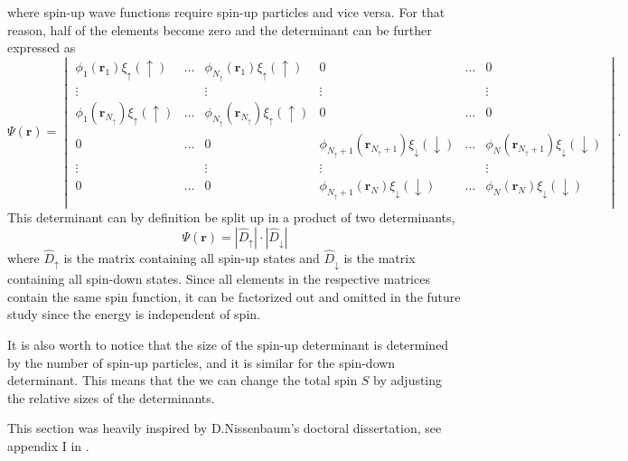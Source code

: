 where spin-up wave functions require spin-up particles and vice versa. For that reason, half of the elements become zero and the determinant can be further expressed as
\begin{equation*}
\Psi(\boldsymbol{r})=
\begin{vmatrix}
\phi_1(\boldsymbol{r}_1)\xi_{\uparrow}(\uparrow) & \hdots & \phi_{N_{\uparrow}}(\boldsymbol{r}_1)\xi_{\uparrow}(\uparrow) & 0 & \hdots & 0\\
\vdots & & \vdots & \vdots & & \vdots \\
\phi_1(\boldsymbol{r}_{N_{\uparrow}})\xi_{\uparrow}(\uparrow) & \hdots & \phi_{N_{\uparrow}}(\boldsymbol{r}_{N_{\uparrow}})\xi_{\uparrow}(\uparrow) & 0 & \hdots & 0\\
0 & \hdots & 0 & \phi_{N_{\uparrow}+1}(\boldsymbol{r}_{N_{\uparrow}+1})\xi_{\downarrow}(\downarrow) & \hdots & \phi_{N}(\boldsymbol{r}_{N_{\uparrow}+1})\xi_{\downarrow}(\downarrow)\\
\vdots & & \vdots & \vdots & & \vdots \\
0 & \hdots & 0 & \phi_{N_{\uparrow}+1}(\boldsymbol{r}_N)\xi_{\downarrow}(\downarrow) & \hdots & \phi_{N}(\boldsymbol{r}_N)\xi_{\downarrow}(\downarrow)\\
\end{vmatrix}.
\end{equation*}
This determinant can by definition be split up in a product of two determinants,
\begin{equation}
\Psi(\boldsymbol{r})=|\hat{D}_{\uparrow}|\cdot |\hat{D}_{\downarrow}|
\end{equation}
where $\hat{D}_{\uparrow}$ is the matrix containing all spin-up states and $\hat{D}_{\downarrow}$ is the matrix containing all spin-down states. Since all elements in the respective matrices contain the same spin function, it can be factorized out and omitted in the future study since the energy is independent of spin.

It is also worth to notice that the size of the spin-up determinant is determined by the number of spin-up particles, and it is similar for the spin-down determinant. This means that the we can change the total spin $S$ by adjusting the relative sizes of the determinants.

This section was heavily inspired by D.Nissenbaum's doctoral dissertation, see appendix I in \cite{nissenbaum_stochastic_2008}.

